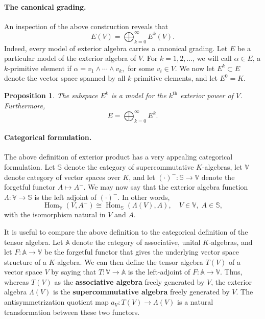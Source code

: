 \documentclass[12pt]{article}
\newcommand{\Sset}{\mathbb{S}}
\newcommand{\Aset}{\mathbb{A}}
\newcommand{\Vset}{\mathbb{V}}
\newcommand{\Hom}{\operatorname{Hom}}
\newcommand{\supth}{^{\text{th}}}
\newtheorem{proposition}{Proposition}
\begin{document}
\paragraph{The canonical grading.}
An inspection of the above
construction reveals that
\[ E(V) = \bigoplus_{k=0}^\infty E^k(V).\] Indeed, every model of
exterior algebra carries a canonical grading. Let $E$ be a particular
model of the exterior algebra of $V$. For $k=1,2,\dots$, we will call
$\alpha\in E$, a $k$-primitive element if $\alpha =
v_1\wedge\cdots\wedge v_k,$ for some $v_i\in V$.  We now let
$E^k\subset E$ denote the vector space spanned by all $k$-primitive
elements, and let $E^0=K$.
\begin{proposition}
  The subspace $E^k$ is a model for the $k\supth$ exterior power of
  $V$.  Furthermore, 
  \[ E = \bigoplus_{k=0}^\infty E^k.\]
\end{proposition} 



\paragraph{Categorical formulation.}
The above definition of exterior product has a very appealing
categorical formulation.  Let $\Sset$ denote the category of
supercommutative $K$-algebras, let $\Vset$ denote category of vector
spaces over $K$, and let $(\cdot)^-:\Sset\to\Vset$ denote the
forgetful functor $A\mapsto A^-$.  We may now say that the
exterior algebra function $\Lambda:\Vset\to\Sset$ is the left
adjoint of $(\cdot)^-$.  In other words,
\[ \Hom_{\Vset}(V,A^-) \cong \Hom_{\Sset}(\Lambda(V), A),\quad V\in\Vset,\; A\in \Sset,\] with the
isomorphism natural in $V$ and $A$.

It is useful to compare the above definition to the categorical
definition of the tensor algebra.  Let $\Aset$ denote the category of
associative, unital $K$-algebras, and let $F:\Aset\to\Vset$ be the
forgetful functor that gives the underlying vector space structure of
a $K$-algebra.  We can then define the tensor algebra $T(V)$ of a
vector space $V$ by saying that $T:\Vset\to\Aset$ is the left-adjoint
of $F:\Aset\to\Vset$.  Thus, whereas $T(V)$ as the \textbf{associative
  algebra} freely generated by $V$, the exterior algebra $\Lambda(V)$
is the \textbf{supercommutative algebra} freely generated by $V$.  The
antisymmetrization 
quotient map $a_V\colon T(V)\to\Lambda(V)$ is a natural transformation between
these two functors.
\end{document}
